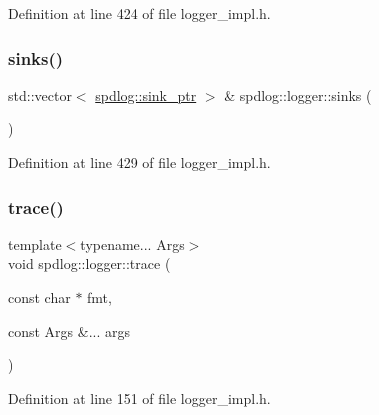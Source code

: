 Definition at line 424 of file logger\+\_\+impl.\+h.

\mbox{\label{classspdlog_1_1logger_a7d93aa2653b924f2c9981d026aea9822}} 
\subsubsection{\texorpdfstring{sinks()}{sinks()}\hspace{0.1cm}{\footnotesize\ttfamily [2/2]}}
{\footnotesize\ttfamily std\+::vector$<$ \hyperlink{namespacespdlog_a422c57d3088160b517e5a74e5f318253}{spdlog\+::sink\+\_\+ptr} $>$ \& spdlog\+::logger\+::sinks (\begin{DoxyParamCaption}{ }\end{DoxyParamCaption})\hspace{0.3cm}{\ttfamily [inline]}}



Definition at line 429 of file logger\+\_\+impl.\+h.

\mbox{\label{classspdlog_1_1logger_a59a8516fe055c6b78c9b1822148f78ec}} 
\subsubsection{\texorpdfstring{trace()}{trace()}\hspace{0.1cm}{\footnotesize\ttfamily [1/2]}}
{\footnotesize\ttfamily template$<$typename... Args$>$ \\
void spdlog\+::logger\+::trace (\begin{DoxyParamCaption}\item[{const char $\ast$}]{fmt,  }\item[{const Args \&...}]{args }\end{DoxyParamCaption})\hspace{0.3cm}{\ttfamily [inline]}}



Definition at line 151 of file logger\+\_\+impl.\+h.

